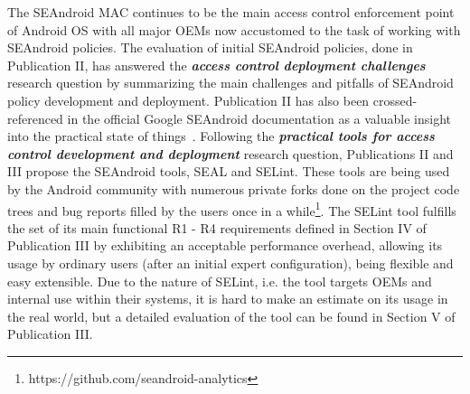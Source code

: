 The SEAndroid MAC continues to be the main access control enforcement point of Android OS with all major OEMs now accustomed to the task of working with SEAndroid policies. The evaluation of initial SEAndroid policies, done in Publication II, has answered the \textit{\textbf{access control deployment challenges}} research question by summarizing the main challenges and pitfalls of SEAndroid policy development and deployment. Publication II has also been crossed-referenced in the official Google SEAndroid documentation as a valuable insight into the practical state of things~\cite{seanroidsize}. Following the \textbf{\textit{practical tools for access control development and deployment}} research question, Publications II and III propose the SEAndroid tools, SEAL and SELint. These tools are being used by the Android community with numerous private forks done on the project code trees and bug reports filled by the users once in a while\footnote{https://github.com/seandroid-analytics}. The SELint tool fulfills the set of its main functional R1 - R4 requirements defined in Section IV of Publication III by exhibiting an acceptable performance overhead, allowing its usage by ordinary users (after an initial expert configuration), being flexible and easy extensible. Due to the nature of SELint, i.e. the tool targets OEMs and internal use within their systems, it is hard to make an estimate on its usage in the real world, but a detailed evaluation of the tool can be found in Section V of Publication III. 

